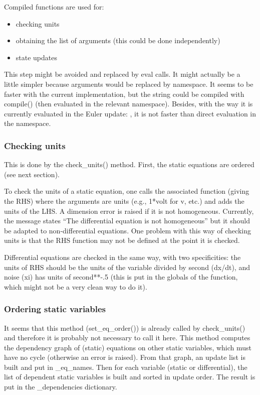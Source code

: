 \documentclass[letterpaper,10pt,english]{manual}
\begin{document}
Compiled functions are used for:
\begin{itemize}
\item {} 
checking units

\item {} 
obtaining the list of arguments (this could be done independently)

\item {} 
state updates

\end{itemize}

This step might be avoided and replaced by eval calls. It might actually be a little simpler because
arguments would be replaced by namespace. It seems to be faster with the current implementation,
but the string could be compiled with compile() (then evaluated in the relevant namespace).
Besides, with the way it is currently evaluated in the Euler update: ,
it is not faster than direct evaluation in the namespace.


\subsubsection{Checking units}

This is done by the check\_units() method.
First, the static equations are ordered (see next section).

To check the units of a static equation, one calls the associated function (giving the RHS) where the
arguments are units (e.g., 1*volt for v, etc.) and adds the units of the LHS. A dimension error is raised
if it is not homogeneous. Currently, the message states ``The differential equation is not homogeneous'' but it
should be adapted to non-differential equations. One problem with this way of checking units is that the RHS function
may not be defined at the point it is checked.

Differential equations are checked in the same way, with two specificities: the units of RHS should be the units
of the variable divided by second (dx/dt), and noise (xi) has units of second**-.5 (this is put in the globals of
the function, which might not be a very clean way to do it).


\subsubsection{Ordering static variables}

It seems that this method (set\_eq\_order()) is already called by check\_units() and therefore it is probably
not necessary to call it here.
This method computes the dependency graph of (static) equations on other static variables,
which must have no cycle (otherwise an error is raised). From that graph, an update list is built and
put in \_eq\_names. Then for each variable (static or differential), the list of dependent static variables is built
and sorted in update order. The result is put in the \_dependencies dictionary.
\end{document}
